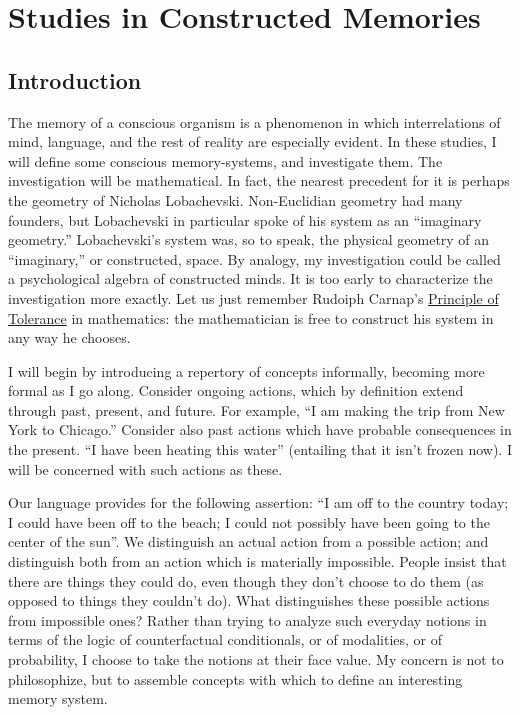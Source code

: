 \chapter{Studies in Constructed Memories}

\section{Introduction}

The memory of a conscious organism is a phenomenon in which 
interrelations of mind, language, and the rest of reality are especially evident. 
In these studies, I will define some conscious memory-systems, and 
investigate them. The investigation will be mathematical. In fact, the nearest 
precedent for it is perhaps the geometry of Nicholas Lobachevski. 
Non-Euclidian geometry had many founders, but Lobachevski in particular 
spoke of his system as an \enquote{imaginary geometry.} Lobachevski's system was, 
so to speak, the physical geometry of an \enquote{imaginary,} or constructed, space. 
By analogy, my investigation could be called a psychological algebra of 
constructed minds. It is too early to characterize the investigation more 
exactly. Let us just remember Rudoiph Carnap's \uline{Principle of Tolerance} in 
mathematics: the mathematician is free to construct his system in any way 
he chooses. 

I will begin by introducing a repertory of concepts informally, becoming more formal as I go along. Consider ongoing actions, which by definition extend through past, present, and future. For example, \enquote{I am making the trip from New York to Chicago.} Consider also past actions which have probable consequences in the present. \enquote{I have been heating this water} (entailing that it isn't frozen now). I will be concerned with such actions as these. 

Our language provides for the following assertion: \enquote{I am off to the country today; I could have been off to the beach; I could not possibly have been going to the center of the sun}. We distinguish an actual action from a possible action; and distinguish both from an action which is materially impossible. People insist that there are things they could do, even though they don't choose to do them (as opposed to things they couldn't do). What distinguishes these possible actions from impossible ones? Rather than trying to analyze such everyday notions in terms of the logic of counterfactual conditionals, or of modalities, or of probability, I choose to take the notions at their face value. My concern is not to philosophize, but to assemble concepts with which to define an interesting memory system. 

